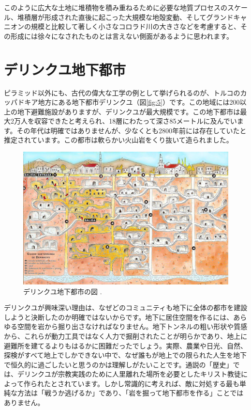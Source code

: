 \documentclass[10pt,twocolumn,letterpaper]{article}
\begin{document}
このように広大な土地に堆積物を積み重ねるために必要な地質プロセスのスケール、堆積層が形成された直後に起こった大規模な地殻変動、そしてグランドキャニオンの規模と比較して著しく小さなコロラド川の大きさなどを考慮すると、その形成には徐々になされたものとは言えない側面があるように思われます。

\section{デリンクユ地下都市}

ピラミッド以外にも、古代の偉大な工学の例として挙げられるのが、トルコのカッパドキア地方にある地下都市デリンクユ（図\ref{fig:5}）です。この地域には200以上の地下避難施設がありますが、デリンクユが最大規模です\cite{54}。この地下都市は最大2万人を収容できたと考えられ、18層にわたって深さ85メートルに及んでいます。その年代は明確ではありませんが、少なくとも2800年前には存在していたと推定されています。この都市は軟らかい火山岩をくり抜いて造られました\cite{52, 53}。

\begin{figure}[b]
\begin{center}
   \includegraphics[width=1\linewidth]{derinkuyu.jpeg}
\end{center}
   \caption{デリンクユ地下都市の図 \cite{56}.}
\label{fig:5}
\label{fig:onecol}
\end{figure}
デリンクユが興味深い理由は、なぜどのコミュニティも地下に全体の都市を建設しようと決断したのか明確ではないからです。地下に居住空間を作るには、あらゆる空間を岩から掘り出さなければなりません。地下トンネルの粗い形状や質感から、これらが動力工具ではなく人力で掘削されたことが明らかであり、地上に避難所を建てるよりもはるかに困難だったでしょう。実際、農業や日光、自然、探検がすべて地上でしかできない中で、なぜ誰もが地上での限られた人生を地下で恒久的に過ごしたいと思うのかは理解しがたいことです。通説の「歴史」では、デリンクユが宗教実践のために人里離れた場所を必要としたキリスト教徒によって作られたとされています\cite{53}。しかし常識的に考えれば、敵に対処する最も単純な方法は「戦うか逃げるか」であり、「岩を掘って地下都市を作る」ことではありません。
\end{document}
